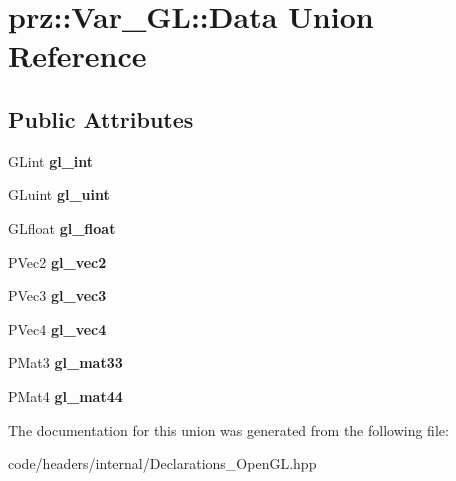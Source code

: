 \hypertarget{unionprz_1_1_var___g_l_1_1_data}{}\section{prz\+::Var\+\_\+\+GL\+::Data Union Reference}
\label{unionprz_1_1_var___g_l_1_1_data}
\subsection*{Public Attributes}
\begin{DoxyCompactItemize}
\item 
\mbox{\label{unionprz_1_1_var___g_l_1_1_data_afe8a18bec0d4ec8da81c6ae4b0e66ce8}} 
G\+Lint {\bfseries gl\+\_\+int}
\item 
\mbox{\label{unionprz_1_1_var___g_l_1_1_data_a9653f6f0c02009f11d55eea07c888544}} 
G\+Luint {\bfseries gl\+\_\+uint}
\item 
\mbox{\label{unionprz_1_1_var___g_l_1_1_data_abae5b0df000556090b0821b0424d7774}} 
G\+Lfloat {\bfseries gl\+\_\+float}
\item 
\mbox{\label{unionprz_1_1_var___g_l_1_1_data_afced5270b20e2a20606d3790ac4c5f4d}} 
P\+Vec2 {\bfseries gl\+\_\+vec2}
\item 
\mbox{\label{unionprz_1_1_var___g_l_1_1_data_a25e845014197249978c288ffc90caf1a}} 
P\+Vec3 {\bfseries gl\+\_\+vec3}
\item 
\mbox{\label{unionprz_1_1_var___g_l_1_1_data_a9a9fccebf887ea6b01117c82ec9e4368}} 
P\+Vec4 {\bfseries gl\+\_\+vec4}
\item 
\mbox{\label{unionprz_1_1_var___g_l_1_1_data_a5760cd7820b6e1482ae9b526289d03b4}} 
P\+Mat3 {\bfseries gl\+\_\+mat33}
\item 
\mbox{\label{unionprz_1_1_var___g_l_1_1_data_aa772faa1fc51e87da4bc209b39d4e6ab}} 
P\+Mat4 {\bfseries gl\+\_\+mat44}
\end{DoxyCompactItemize}


The documentation for this union was generated from the following file\+:\begin{DoxyCompactItemize}
\item 
code/headers/internal/Declarations\+\_\+\+Open\+G\+L.\+hpp\end{DoxyCompactItemize}
